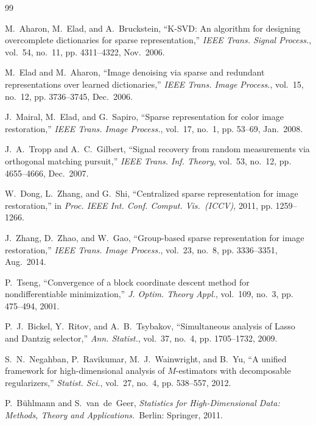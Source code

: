\documentclass[journal,onecolumn,11pt]{IEEEtran}
\theoremstyle{definition}
\begin{document}
\begin{thebibliography}{99}

M.~Aharon, M.~Elad, and A.~Bruckstein,
``K-SVD: An algorithm for designing overcomplete dictionaries for sparse
representation,''
\emph{IEEE Trans. Signal Process.}, vol.~54, no.~11, pp. 4311--4322, Nov.\ 2006.

M.~Elad and M.~Aharon,
``Image denoising via sparse and redundant representations over learned
dictionaries,''
\emph{IEEE Trans. Image Process.}, vol.~15, no.~12, pp. 3736--3745, Dec.\ 2006.

J.~Mairal, M.~Elad, and G.~Sapiro,
``Sparse representation for color image restoration,''
\emph{IEEE Trans. Image Process.}, vol.~17, no.~1, pp. 53--69, Jan.\ 2008.

J.~A.~Tropp and A.~C.~Gilbert,
``Signal recovery from random measurements via orthogonal matching
pursuit,''
\emph{IEEE Trans. Inf. Theory}, vol.~53, no.~12, pp. 4655--4666, Dec.\ 2007.

W.~Dong, L.~Zhang, and G.~Shi,
``Centralized sparse representation for image restoration,''
in \emph{Proc. IEEE Int. Conf. Comput. Vis.\ (ICCV)}, 2011, pp. 1259--1266.

J.~Zhang, D.~Zhao, and W.~Gao,
``Group-based sparse representation for image restoration,''
\emph{IEEE Trans. Image Process.}, vol.~23, no.~8, pp. 3336--3351, Aug.\ 2014.

P.~Tseng,
``Convergence of a block coordinate descent method for nondifferentiable
minimization,''
\emph{J. Optim. Theory Appl.}, vol.~109, no.~3, pp. 475--494, 2001.

P.~J.~Bickel, Y.~Ritov, and A.~B.~Tsybakov,
``Simultaneous analysis of Lasso and Dantzig selector,''
\emph{Ann. Statist.}, vol.~37, no.~4, pp. 1705--1732, 2009.

S.~N.~Negahban, P.~Ravikumar, M.~J.~Wainwright, and B.~Yu,
``A unified framework for high-dimensional analysis of $M$-estimators
with decomposable regularizers,''
\emph{Statist. Sci.}, vol.~27, no.~4, pp. 538--557, 2012.

P.~B\"uhlmann and S.~van~de~Geer,
\emph{Statistics for High-Dimensional Data: Methods, Theory and
Applications.}\ Berlin: Springer, 2011.


\end{thebibliography}
\end{document}
